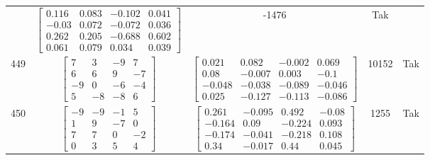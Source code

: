 \documentclass[a4paper,12pt]{article}
\begin{document}
\begin{tabular}{c c c c c}
&
$\begin{bmatrix} 0.116 & 0.083 & -0.102 & 0.041 \\ -0.03 & 0.072 & -0.072 & 0.036 \\ 0.262 & 0.205 & -0.688 & 0.602 \\ 0.061 & 0.079 & 0.034 & 0.039 \end{bmatrix}$
&
-1476
&
Tak
\\
449
&
$\begin{bmatrix} 7 & 3 & -9 & 7 \\ 6 & 6 & 9 & -7 \\ -9 & 0 & -6 & -4 \\ 5 & -8 & -8 & 6 \end{bmatrix}$
&
$\begin{bmatrix} 0.021 & 0.082 & -0.002 & 0.069 \\ 0.08 & -0.007 & 0.003 & -0.1 \\ -0.048 & -0.038 & -0.089 & -0.046 \\ 0.025 & -0.127 & -0.113 & -0.086 \end{bmatrix}$
&
10152
&
Tak
\\
450
&
$\begin{bmatrix} -9 & -9 & -1 & 5 \\ 1 & 9 & -7 & 0 \\ 7 & 7 & 0 & -2 \\ 0 & 3 & 5 & 4 \end{bmatrix}$
&
$\begin{bmatrix} 0.261 & -0.095 & 0.492 & -0.08 \\ -0.164 & 0.09 & -0.224 & 0.093 \\ -0.174 & -0.041 & -0.218 & 0.108 \\ 0.34 & -0.017 & 0.44 & 0.045 \end{bmatrix}$
&
1255
&
Tak
\\
\end{tabular} \egroup \newpage
\end{document}
